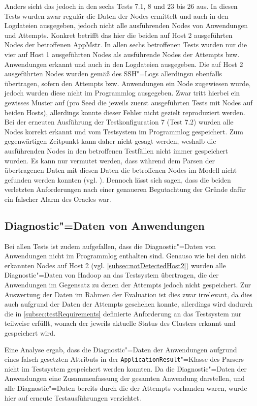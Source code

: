 Anders sieht das jedoch in den sechs Tests 7.1, 8 und 23 bis 26 aus.
In diesen Tests wurden zwar regulär die Daten der Nodes ermittelt und auch in den Logdateien ausgegeben, jedoch nicht alle ausführenden Nodes von Anwendungen und Attempts.
Konkret betrifft das hier die beiden auf Host 2 ausgeführten Nodes der betroffenen \ac{AppMstr}.
In allen sechs betroffenen Tests wurden nur die vier auf Host 1 ausgeführten Nodes als ausführende Nodes der Attempts bzw. Anwendungen erkannt und auch in den Logdateien ausgegeben.
Die auf Host 2 ausgeführten Nodes wurden gemäß des SSH"=Logs allerdingsn ebenfalls übertragen, sofern den Attempts bzw. Anwendungen ein Node zugewiesen wurde, jedoch wurden diese nicht im Programmlog ausgegeben.
Zwar tritt hierbei ein gewisses Muster auf (pro Seed die jeweils zuerst ausgeführten Tests mit Nodes auf beiden Hosts), allerdings konnte dieser Fehler nicht gezielt reproduziert werden.
Bei der erneuten Ausführung der Testkonfiguration 7 (Test 7.2) wurden alle Nodes korrekt erkannt und vom Testsystem im Programmlog gespeichert.
Zum gegenwärtigen Zeitpunkt kann daher nicht gesagt werden, weshalb die ausführenden Nodes in den betroffenen Testfällen nicht immer gespeichert wurden.
Es kann nur vermutet werden, dass während dem Parsen der übertragenen Daten mit diesen Daten die betroffenen Nodes im Modell nicht gefunden werden konnten (vgl. ).
Dennoch lässt sich sagen, dass die beiden verletzten Anforderungen nach einer genaueren Begutachtung der Gründe dafür ein falscher Alarm des Oracles war.

\subsection{Diagnostic"=Daten von Anwendungen}
\label{subsec:notSavedAppDiagnostics}

Bei allen Tests ist zudem aufgefallen, dass die Diagnostic"=Daten von Anwendungen nicht im Programmlog enthalten sind.
Genauso wie bei den nicht erkannten Nodes auf Host 2 (vgl. \cref{subsec:notDetectedHost2}) wurden alle Diagnostic"=Daten von Hadoop an das Testsystem übertragen, die der Anwendungen im Gegensatz zu denen der Attempts jedoch nicht gespeichert.
Zur Auswertung der Daten im Rahmen der Evaluation ist dies zwar irrelevant, da dies auch aufgrund der Daten der Attempts geschehen konnte, allerdings wird dadurch die in \cref{subsec:testRequirements} definierte Anforderung an das Testsystem nur teilweise erfüllt, wonach der jeweils aktuelle Status des Clusters erkannt und gespeichert wird.

Eine Analyse ergab, dass die Diagnostic"=Daten der Anwendungen aufgrund eines falsch gesetzten Attributs in der \texttt{ApplicationResult}"=Klasse des Parsers nicht im Testsystem gespeichert werden konnten. 
Da die Diagnostic"=Daten der Anwendungen eine Zusammenfassung der gesamten Anwendung darstellen, und alle Diagnostic"=Daten bereits durch die der Attempts vorhanden waren, wurde hier auf erneute Testausführungen verzichtet.
